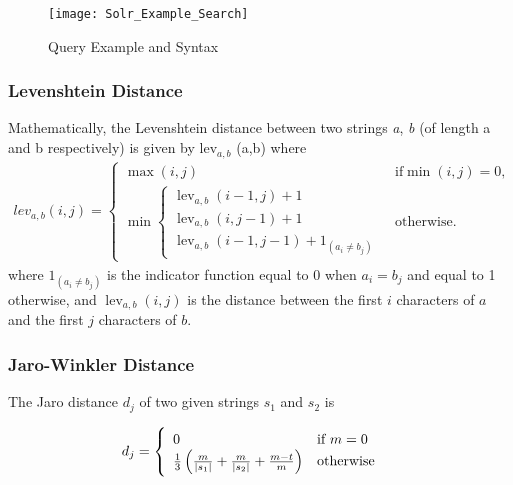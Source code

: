 \begin{figure}[h!]
	\texttt{[image: Solr\_Example\_Search]}
	\caption[Query Example and Syntax]
	{Query Example and Syntax}
	\label{fig:Solr_Example_Search}
\end{figure}



\subsubsection{Levenshtein Distance}
Mathematically, the Levenshtein distance between two strings \textit{a}, \textit{b} (of length \text{\textbar}a\text{\textbar} and \text{\textbar}b\text{\textbar} respectively) is given by lev$_{a,b}$ (\text{\textbar}a\text{\textbar},\text{\textbar}b\text{\textbar}) where
\begin{align}
	lev_{a,b}(i,j) = 
	\begin{cases}
		\max(i,j) & \text{ if} \min(i,j)=0, \\
		\min \begin{cases}
			\operatorname{lev}_{a,b}(i-1,j) + 1 \\
			\operatorname{lev}_{a,b}(i,j-1) + 1 \\
			\operatorname{lev}_{a,b}(i-1,j-1) + 1_{(a_i \neq b_j)}
		\end{cases} & \text{ otherwise.}
	\end{cases}
\end{align}
where $1_{(a_i \neq b_j)}$ is the indicator function equal to $0$ when $a_i = b_j$ and equal to 1 otherwise, and $\operatorname{lev}_{a,b}(i,j)$ is the distance between the first $i$ characters of $a$ and the first $j$ characters of $b$.

\subsubsection{Jaro-Winkler Distance}
The Jaro distance $d_j$ of two given strings $s_1$ and $s_2$ is
 
\begin{align}
 d_j =\begin{cases}
 \begin{array}{l l}
 	0 & \text{if }m = 0\\
 	\frac{1}{3}\left(\frac{m}{|s_1|} + \frac{m}{|s_2|} + \frac{m-t}{m}\right) & \text{otherwise} \end{array} \end{cases}
\end{align}

